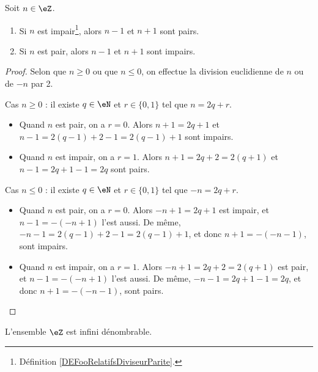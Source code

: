 \begin{lemma}	\label{LEMooCMOEooSoeclk}
	Soit \( n\in \eZ\).
	\begin{enumerate}
		\item
		      Si \( n\) est impair\footnote{Définition \ref{DEFooRelatifsDiviseurParite}.}, alors \( n-1\) et \( n+1\) sont pairs.
		\item
		      Si \( n\) est pair, alors \( n-1\) et \( n+1\) sont impairs.
	\end{enumerate}
\end{lemma}

\begin{proof}
	Selon que \( n \geq 0 \) ou que \( n \leq 0 \), on effectue la division euclidienne de \( n \) ou de \( -n \) par 2.
	\begin{subproof}
		\item[Cas \( n \geq 0 \)]: il existe \( q \in \eN \) et \( r \in \{ 0, 1\} \) tel que \( n = 2q+r \).
		\begin{itemize}
			\item
			      Quand \( n \) est pair, on a \( r = 0 \). Alors \( n+1 = 2q + 1 \) et \( n - 1 = 2(q-1) + 2 - 1 =  2(q-1) + 1 \) sont impairs.
			\item
			      Quand \( n \) est impair, on a \( r = 1 \). Alors \( n+1 = 2q + 2 = 2(q+1) \) et \( n - 1 = 2q + 1 - 1 =  2q \) sont pairs.
		\end{itemize}
		\item[Cas \( n \leq 0 \)]: il existe \( q \in \eN \) et \( r \in \{ 0, 1\} \) tel que \( -n = 2q+r \).
		\begin{itemize}
			\item
			      Quand \( n \) est pair, on a \( r = 0 \). Alors \( -n+1 = 2q + 1 \) est impair, et \( n-1 = -(-n+1) \) l'est aussi. De même, \( -n - 1 = 2(q-1) + 2 - 1 =  2(q-1) + 1 \), et donc \( n+1 = -(-n-1) \), sont impairs.
			\item
			      Quand \( n \) est impair, on a \( r = 1 \). Alors \( -n+1 = 2q + 2 = 2(q+1) \) est pair, et \( n-1 = -(-n+1) \) l'est aussi. De même, \( -n - 1 = 2q + 1 - 1 =  2q \), et donc \( n+1 = -(-n-1) \), sont pairs.
		\end{itemize}
	\end{subproof}
\end{proof}

\begin{lemma}       \label{LEMooJNXIooBmdOVi}
	L'ensemble \( \eZ\) est infini dénombrable.
\end{lemma}

